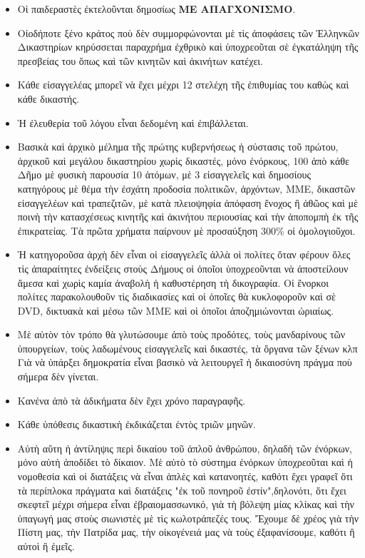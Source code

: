 \documentclass[a4paper]{article}
\begin{document}
\begin{itemize}
\item Οἱ παιδεραστὲς ἐκτελοῦνται δημοσίως \textbf{ΜΕ ΑΠΑΓΧΟΝΙΣΜΟ}.
\item Οἱοδήποτε ξένο κράτος ποὺ δὲν συμμορφώνονται μὲ τὶς ἀποφάσεις τῶν Ἑλληνκῶν Δικαστηρίων κηρύσσεται παραχρήμα ἐχθρικὸ καὶ ὑποχρεοῦται σὲ ἐγκατάληψη τῆς πρεσβείας του ὅπως καὶ τῶν κινητῶν καὶ ἀκινήτων κατέχει.
\item Κάθε εἰσαγγελέας μπορεῖ νὰ ἔχει μέχρι 12 στελέχη τῆς ἐπιθυμίας του καθὼς καὶ κάθε δικαστής.
\item Ἡ ἐλευθερία τοῦ λόγου εἶναι δεδομένη καὶ ἐπιβάλλεται.
\item Βασικὰ καὶ ἀρχικὸ μέλημα τῆς πρώτης κυβερνήσεως ἡ σύστασις τοῦ πρώτου, ἀρχικοῦ καὶ μεγάλου δικαστηρίου χωρὶς δικαστές, μόνο ἐνόρκους, 100 ἀπὸ κάθε Δῆμο μὲ φυσικὴ παρουσία 10 ἀτόμων, μὲ 3 εἰσαγγελεῖς καὶ δημοσίους κατηγόρους μὲ θέμα τὴν ἐσχάτη προδοσία πολιτικῶν, ἀρχόντων, ΜΜΕ, δικαστῶν εἰσαγγελέων καὶ τραπεζιτῶν, μὲ κατὰ πλειοψηφία ἀπόφαση ἔνοχος ἢ ἀθῶος καὶ μὲ ποινὴ τὴν κατασχέσεως κινητῆς καὶ ἀκινήτου περιουσίας καὶ τὴν ἀποπομπὴ ἐκ τῆς ἐπικρατείας. Τὰ πρῶτα χρήματα παίρνουν μὲ προσαύξηση 300\% οἱ ὁμολογιοῦχοι.
\item Ἡ κατηγοροῦσα ἀρχὴ δὲν εἶναι οἱ εἰσαγγελεῖς ἀλλὰ οἱ πολίτες ὅταν φέρουν ὅλες τὶς ἀπαραίτητες ἐνδείξεις στοὺς Δήμους οἱ ὁποῖοι ὑποχρεοῦνται νὰ ἀποστείλουν ἄμεσα καὶ χωρὶς καμία ἀναβολὴ ἡ καθυστέρηση τὴ δικογραφία. Οἱ ἔνορκοι πολίτες παρακολουθοῦν τὶς διαδικασίες καὶ οἱ ὁποῖες θὰ κυκλοφοροῦν καὶ σὲ DVD, δικτυακὰ καὶ μέσω τῶν ΜΜΕ καὶ οἱ ὁποῖοι ἀποζημιώνονται ὠριαίως.
\item Μὲ αὐτὸν τὸν τρόπο θὰ γλυτώσουμε ἀπὸ τοὺς προδότες, τοὺς μανδαρίνους τῶν ὑπουργείων, τοὺς λαδωμένους εἰσαγγελεῖς καὶ δικαστές, τὰ ὄργανα τῶν ξένων κλπ Γιὰ νὰ ὑπάρξει δημοκρατία εἶναι βασικὸ νὰ λειτουργεῖ ἡ δικαιοσύνη πράγμα ποὺ σήμερα δὲν γίνεται.
\item Κανένα ἀπὸ τὰ ἀδικήματα δὲν ἔχει χρόνο παραγραφῆς.
\item Κάθε ὑπόθεσις δικαστικὴ ἐκδικάζεται ἐντὸς τριῶν μηνῶν.
\item Αὐτὴ αὕτη ἡ ἀντίληψις περὶ δικαίου τοῦ ἁπλοῦ ἀνθρώπου, δηλαδὴ τῶν ἐνόρκων, μόνο αὐτὴ ἀποδίδει τὸ δίκαιον. Μὲ αὐτὸ τὸ σύστημα ἐνόρκων ὑποχρεοῦται καὶ ἡ νομοθεσία καὶ οἱ διατάξεις νὰ εἶναι ἁπλὲς καὶ κατανοητές, καθότι ἔχει γραφεῖ ὅτι τὰ περίπλοκα πράγματα καὶ διατάξεις "ἐκ τοῦ πονηροῦ ἐστίν",δηλονότι, ὅτι ἔχει σκεφτεῖ μέχρι σήμερα εἶναι ἐβραιομασσωνικό, γιὰ τὴ βόλεψη μίας κλίκας καὶ τὴν ὑπαγωγή μας στοὺς σιωνιστὲς μὲ τὶς κωλοτράπεζές τους. Ἔχουμε δὲ χρέος γιὰ τὴν Πίστη μας, τὴν Πατρίδα μας, τὴν οἰκογένειά μας νὰ τοὺς ἐξαφανίσουμε, καθότι ἢ αὐτοὶ ἢ ἐμεῖς.

\end{itemize}
\end{document}
